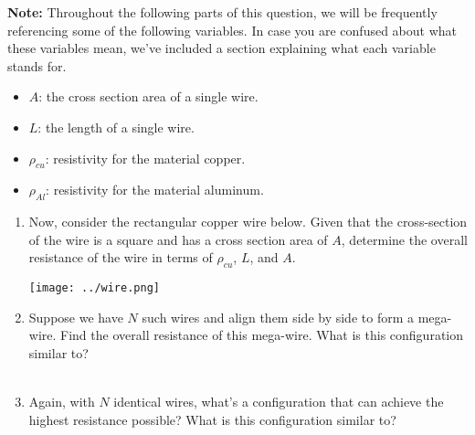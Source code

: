 \textbf{Note:} Throughout the following parts of this question, we will be frequently referencing some of the following variables. In case you are confused about what these variables mean, we've included a section explaining what each variable stands for.
\begin{itemize}
    \item $A$: the cross section area of a single wire.
    \item $L$: the length of a single wire.
    \item $\rho_{cu}$: resistivity for the material copper.
    \item $\rho_{Al}$: resistivity for the material aluminum.
\end{itemize}
\begin{enumerate}
    \item Now, consider the rectangular copper wire below. Given that the cross-section of the wire is a square and has a cross section area of $A$, determine the overall resistance of the wire in terms of $\rho_{cu}$, $L$, and $A$.
    \begin{center}
            \texttt{[image: ../wire.png]}
    \end{center}
    \item Suppose we have $N$ such wires and align them side by side to form a mega-wire. Find the overall resistance of this mega-wire. What is this configuration similar to? \\
     \\
    \item Again, with $N$ identical wires, what's a configuration that can achieve the highest resistance possible? What is this configuration similar to? \\

\end{enumerate}
